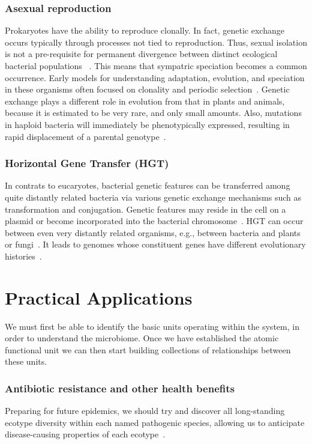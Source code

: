 \subsubsection*{Asexual reproduction}
Prokaryotes have the ability to reproduce clonally.
In fact, genetic exchange occurs typically through processes not tied to reproduction.
Thus, sexual isolation is not a pre-requisite for permanent divergence between distinct ecological bacterial populations ~\cite{cohan2007systematics}.
This means that sympatric speciation becomes a common occurrence.
Early models for understanding adaptation, evolution, and speciation in these organisms often focused on clonality and periodic selection~\cite{gogarten2002prokaryotic}.
Genetic exchange plays a different role in evolution from that in plants and animals, because it is estimated to be very rare, and only small amounts.
Also, mutations in haploid bacteria will immediately be phenotypically expressed, resulting in rapid displacement of a parental genotype~\cite{staley1997biodiversity}.

\subsubsection*{Horizontal Gene Transfer (HGT)}
In contrats to eucaryotes, bacterial genetic features can be transferred among quite distantly related bacteria via various genetic exchange mechanisms such as transformation and conjugation.
Genetic features may reside in the cell on a plasmid or become incorporated into the bacterial chromosome~\cite{staley1997biodiversity}.
HGT can occur between even very distantly related organisms, e.g., between bacteria and plants or fungi~\cite{gogarten2002prokaryotic}.
It leads to genomes whose constituent genes have different evolutionary histories~\cite{gogarten2002prokaryotic}.

\section{Practical Applications}
We must first be able to identify the basic units operating within the system, in order to understand the microbiome.
Once we have established the atomic functional unit we can then start building collections of relationships between these units. 

\subsubsection*{Antibiotic resistance and other health benefits}
Preparing for future epidemics, we should try and discover all long-standing ecotype diversity within each named pathogenic species, allowing us to anticipate disease-causing properties of each ecotype~\cite{cohan2007systematics}.

